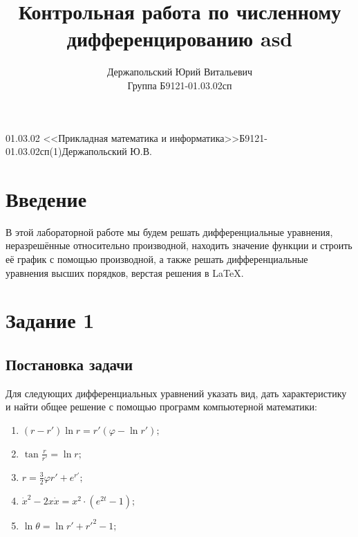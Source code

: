 \documentclass[14pt, a4paper, titlepage, fleqn]{extarticle}
\title{Контрольная работа по численному дифференцированию asd }
\author{Держапольский Юрий Витальевич \\ Группа Б9121-01.03.02сп}
\date{}
\begin{document}
    {01.03.02 <<Прикладная математика и информатика>>}{Б9121-01.03.02сп(1)}{Держапольский Ю.В.}

    \tableofcontents

    \pagebreak

    \section{Введение}
        В этой лабораторной работе мы будем решать дифференциальные 
        уравнения, неразрешённые относительно производной, находить значение
        функции и строить её график с помощью производной, 
        а также решать дифференциальные уравнения высших
        порядков, верстая решения в \LaTeX.

    \pagebreak

    \section{Задание 1}
        \subsection{Постановка задачи}
            Для следующих дифференциальных уравнений указать вид,
            дать характеристику и найти общее решение с помощью программ
            компьютерной математики:

            \begin{enumerate}
                \item \( (r-r') \ln{r} = r' \left( \varphi - \ln{r'} \right); \)
                \item \( \tan{\frac{r}{r'}} = \ln{r}; \)
                \item \( r = \frac{3}{2} \varphi r' + e^{r'}; \)
                \item \( \dot{x}^2 - 2x \dot{x} = x^2 \cdot \left( e^{2t} - 1 \right); \)
                \item \( \ln{\theta} = \ln{r'} + r'^2 - 1; \)
            \end{enumerate}

        
\end{document}
